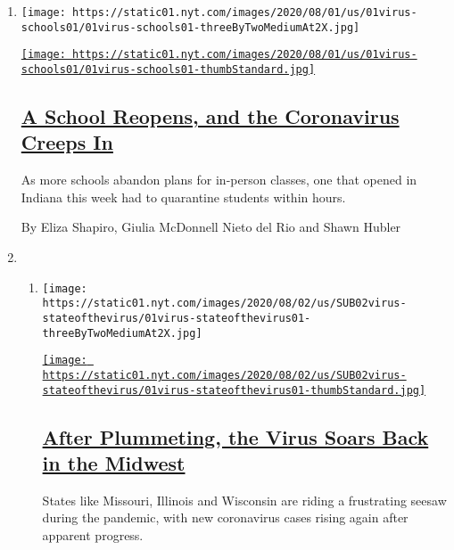 \begin{enumerate}
\def\labelenumi{\arabic{enumi}.}
\item
  \texttt{[image: https://static01.nyt.com/images/2020/08/01/us/01virus-schools01/01virus-schools01-threeByTwoMediumAt2X.jpg]}

  \href{/2020/08/01/us/schools-reopening-indiana-coronavirus.html}{\texttt{[image: https://static01.nyt.com/images/2020/08/01/us/01virus-schools01/01virus-schools01-thumbStandard.jpg]}}

  \hypertarget{a-school-reopens-and-the-coronavirus-creeps-in}{%
  \subsection{\texorpdfstring{\href{/2020/08/01/us/schools-reopening-indiana-coronavirus.html}{A
  School Reopens, and the Coronavirus Creeps
  In}}{A School Reopens, and the Coronavirus Creeps In}}\label{a-school-reopens-and-the-coronavirus-creeps-in}}

  As more schools abandon plans for in-person classes, one that opened
  in Indiana this week had to quarantine students within hours.

  By Eliza Shapiro, Giulia McDonnell Nieto del Rio and Shawn Hubler
\item
  \begin{enumerate}
  \def\labelenumii{\arabic{enumii}.}
  \item
    \texttt{[image: https://static01.nyt.com/images/2020/08/02/us/SUB02virus-stateofthevirus/01virus-stateofthevirus01-threeByTwoMediumAt2X.jpg]}

    \href{/2020/08/01/us/coronavirus-midwest-cases-deaths.html}{\texttt{[image: https://static01.nyt.com/images/2020/08/02/us/SUB02virus-stateofthevirus/01virus-stateofthevirus01-thumbStandard.jpg]}}

    \hypertarget{after-plummeting-the-virus-soars-back-in-the-midwest}{%
    \subsection{\texorpdfstring{\href{/2020/08/01/us/coronavirus-midwest-cases-deaths.html}{After
    Plummeting, the Virus Soars Back in the
    Midwest}}{After Plummeting, the Virus Soars Back in the Midwest}}\label{after-plummeting-the-virus-soars-back-in-the-midwest}}

    States like Missouri, Illinois and Wisconsin are riding a
    frustrating seesaw during the pandemic, with new coronavirus cases
    rising again after apparent progress.


\end{enumerate}
\end{enumerate}
